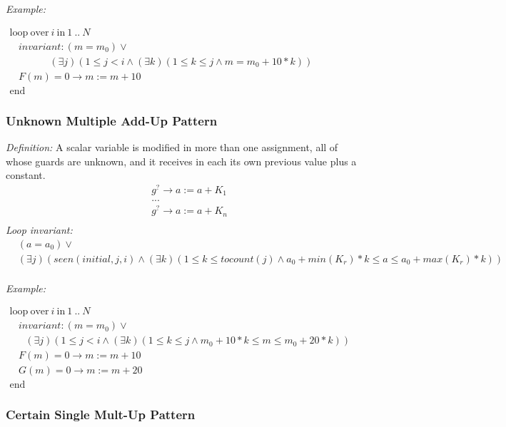 \documentclass[a4paper,10pt]{article}
\newcommand{\idx}{\ensuremath{i}\xspace}
\newcommand{\idxinitial}{\ensuremath{\mathit{initial}}\xspace}
\newcommand{\KWloop}{\ensuremath{\mathrm{loop}~}}
\newcommand{\KWend}{\ensuremath{\mathrm{end}~}}
\newcommand{\KWover}{\ensuremath{\mathrm{over}~}}
\newcommand{\KWin}{\ensuremath{~\mathrm{in}~}}
\newcommand{\seen}[3]{\ensuremath{\mathit{seen}{(#1,#2,#3)}}\xspace}
\newcommand{\tocount}[1]{\ensuremath{\mathit{tocount}(#1)}\xspace}
\newcommand{\loopinvariant}{\noindent\textit{Loop invariant:}\xspace}
\newcommand{\patterndef}{\noindent\textit{Definition:}\xspace}
\newcommand{\patternexample}{\noindent\textit{Example:}\xspace}
\begin{document}
\bigskip
\patternexample

\medskip
$\begin{array}{l}
  \KWloop \KWover i \KWin 1~..~N \\
  ~~~~ \textit{invariant}: (m = m_0) \lor \\
  ~~~~~~~~~~~~~~~~~~ (\exists j)(1 \leq j < i \land (\exists k)(1 \leq k \leq j \land m = m_0+10*k))\\
  ~~~~ F(m)=0 \rightarrow m := m+10\\
  \KWend
\end{array}$

\subsubsection*{Unknown Multiple Add-Up Pattern}

\patterndef A scalar variable is modified in more than one assignment, all of
whose guards are unknown, and it receives in each its own previous value
plus a constant.
%
\begin{eqnarray*}
&g^? \rightarrow a := a + K_1\\
&...\\
&g^? \rightarrow a := a + K_n\\
\end{eqnarray*}
%
\loopinvariant
%
\begin{eqnarray*}
&(a = a_0) \lor\\
&(\exists j)(\seen{\idxinitial}{j}{\idx} \land (\exists k)(1 \leq k \leq \tocount{j} \land a_0 + \mathit{min}(K_r)*k \leq a \leq a_0 + \mathit{max}(K_r)*k))\\
\end{eqnarray*}

\bigskip
\patternexample

\medskip
$\begin{array}{l}
  \KWloop \KWover i \KWin 1~..~N \\
  ~~~~ \textit{invariant}: (m = m_0) \lor \\
  ~~~~~~~ (\exists j)(1 \leq j < i \land (\exists k)(1 \leq k \leq j \land m_0+10*k \leq m \leq m_0 +20*k))\\
  ~~~~ F(m)=0 \rightarrow m := m+10\\
  ~~~~ G(m)=0 \rightarrow m := m+20\\
  \KWend
\end{array}$

\subsubsection*{Certain Single Mult-Up Pattern}
\end{document}
